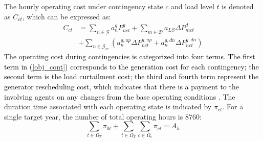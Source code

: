 \documentclass[journal]{IEEEtran}
\begin{document}
The hourly operating cost under contingency state $c$ and load level $t$ is denoted as $C_{ct}$, which can be expressed as:
\begin{align}
	C_{ct}&=\sum_{n\in \mathcal{G}}a_{n}^gP^g_{nct}+\sum_{m\in \mathcal{D}}a_{LS}\Delta P^d_{mct} \nonumber \\ 
	&+\sum_{n\in \mathcal{G}_{re}}(a_n^{g,up}\Delta P^{g,up}_{nct}+a_n^{g,dn}\Delta P^{g,dn}_{nct})                        \label{obj_cont} 
\end{align} 
\textcolor{black}{The operating cost during contingencies is categorized into four terms. The first term in (\ref{obj_cont}) corresponds to the generation cost for each contingency; the second term is the load curtailment cost; the  third and fourth term represent the generator rescheduling cost, which indicates that there is a payment to the involving agents on any changes from the base operating conditions \cite{mybibb:opf_redispatch_facts}.} The duration time associated with each operating state is indicated by $\pi_{ct}$. For a single target year, the number of total operating hours is 8760:
\begin{equation}
	\sum_{t\in \Omega_T}\pi_{0t}+\sum_{t\in \Omega_T}\sum_{c\in \Omega_c}\pi_{ct}=A_h    \label{operating_hour}
\end{equation}   
\end{document}
